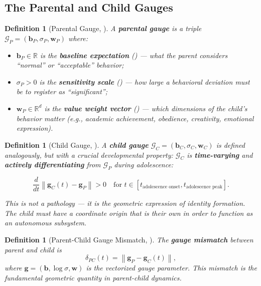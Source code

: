 \documentclass[11pt,a4paper]{article}
\newtheorem{definition}[theorem]{Definition}
\newcommand{\R}{\mathbb{R}}
\newcommand{\cG}{\mathcal{G}}
\newcommand{\norm}[1]{\left\lVert#1\right\rVert}
\begin{document}
\subsection{The Parental and Child Gauges}

\begin{definition}[Parental Gauge, \textbf{}]
\label{def:parental_gauge}
A \textbf{parental gauge} is a triple $\cG_P = (\mathbf{b}_P, \sigma_P, \mathbf{w}_P)$ where:
\begin{itemize}
    \item $\mathbf{b}_P \in \R$ is the \textbf{baseline expectation} () — what the parent considers ``normal'' or ``acceptable'' behavior;
    \item $\sigma_P > 0$ is the \textbf{sensitivity scale} () — how large a behavioral deviation must be to register as ``significant'';
    \item $\mathbf{w}_P \in \R^d$ is the \textbf{value weight vector} () — which dimensions of the child's behavior matter (e.g., academic achievement, obedience, creativity, emotional expression).
\end{itemize}
\end{definition}

\begin{definition}[Child Gauge, \textbf{}]
\label{def:child_gauge}
A \textbf{child gauge} $\cG_C = (\mathbf{b}_C, \sigma_C, \mathbf{w}_C)$ is defined analogously, but with a crucial developmental property: $\cG_C$ is \textbf{time-varying} and \textbf{actively differentiating} from $\cG_P$ during adolescence:

\begin{equation}
    \frac{d}{dt}\norm{\mathbf{g}_C(t) - \mathbf{g}_P} > 0 \quad \text{for } t \in [t_{\text{adolescence onset}}, t_{\text{adolescence peak}}].
\end{equation}

This is not a pathology — it is the geometric expression of identity formation. The child must have a coordinate origin that is \textit{their own} in order to function as an autonomous subsystem.
\end{definition}

\begin{definition}[Parent-Child Gauge Mismatch, \textbf{}]
\label{def:gauge_mismatch}
The \textbf{gauge mismatch} between parent and child is
\begin{equation}
    \delta_{PC}(t) = \norm{\mathbf{g}_P - \mathbf{g}_C(t)},
\end{equation}
where $\mathbf{g} = (\mathbf{b}, \log\sigma, \mathbf{w})$ is the vectorized gauge parameter. This mismatch is the fundamental geometric quantity in parent-child dynamics.
\end{definition}
\end{document}
